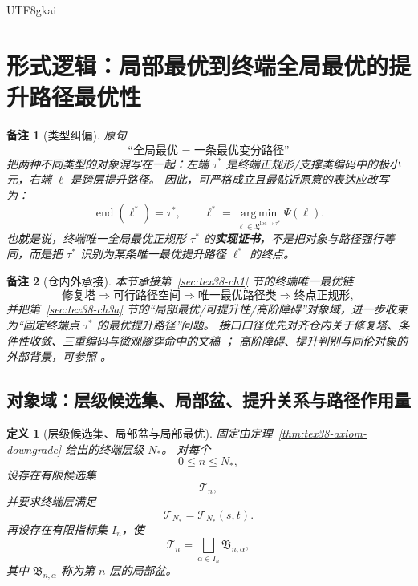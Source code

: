 \documentclass[12pt]{article}
\newtheorem{definition}{定义}[section]
\newtheorem{remark}{备注}[section]
\begin{document}
\begin{CJK*}{UTF8}{gkai}
\clearpage

\section{形式逻辑：局部最优到终端全局最优的提升路径最优性}
\label{sec:tex38-ch3b}

\begin{remark}[类型纠偏]
原句
\[
  \text{“全局最优 = 一条最优变分路径”}
\]
把两种不同类型的对象混写在一起：左端 $\tau^\ast$ 是终端正规形/支撑类编码中的极小元，右端 $\ell$ 是跨层提升路径。
因此，可严格成立且最贴近原意的表达应改写为：
\[
  \operatorname{end}(\ell^\ast)=\tau^\ast,
  \qquad
  \ell^\ast
  =
  \operatorname*{arg\,min}_{\ell\in\mathfrak L^{\mathrm{loc}\to\tau^\ast}}
  \Psi(\ell).
\]
也就是说，终端唯一全局最优正规形 $\tau^\ast$ 的\textbf{实现证书}，不是把对象与路径强行等同，而是把 $\tau^\ast$ 识别为某条唯一最优提升路径 $\ell^\ast$ 的终点。
\end{remark}

\begin{remark}[仓内外承接]
本节承接第~\ref{sec:tex38-ch1} 节的终端唯一最优链
\[
  \text{修复塔}
  \Longrightarrow
  \text{可行路径空间}
  \Longrightarrow
  \text{唯一最优路径类}
  \Longrightarrow
  \text{终点正规形},
\]
并把第~\ref{sec:tex38-ch3a} 节的“局部最优/可提升性/高阶障碍”对象域，进一步收束为“固定终端点 $\tau^\ast$ 的最优提升路径”问题。
接口口径优先对齐仓内关于修复塔、条件性收敛、三重编码与微观隧穿命中的文稿
\cite{RepoTex29TransfiniteRepair,RepoTex31RepairTower,RepoTex32ConditionalConvergence,RepoTex36HomotopyTwistBijection}；
高阶障碍、提升判别与同伦对象的外部背景，可参照
\cite{Whitehead1978Elements,Weibel1994HomologicalAlgebra}。
\end{remark}

\subsection{对象域：层级候选集、局部盆、提升关系与路径作用量}
\label{subsec:tex38-liftpath-objects}

\begin{definition}[层级候选集、局部盆与局部最优]
\label{def:tex38-lift-basin}
固定由定理~\ref{thm:tex38-axiom-downgrade} 给出的终端层级 $N_\ast$。
对每个
\[
  0\le n\le N_\ast,
\]
设存在有限候选集
\[
  \mathcal T_n,
\]
并要求终端层满足
\[
  \mathcal T_{N_\ast}=\mathcal T_{N_\ast}(s,t).
\]
再设存在有限指标集 $I_n$，使
\[
  \mathcal T_n=\bigsqcup_{\alpha\in I_n}\mathfrak B_{n,\alpha},
\]
其中 $\mathfrak B_{n,\alpha}$ 称为第 $n$ 层的\emph{局部盆}。


\end{definition}
\end{CJK*}
\end{document}

